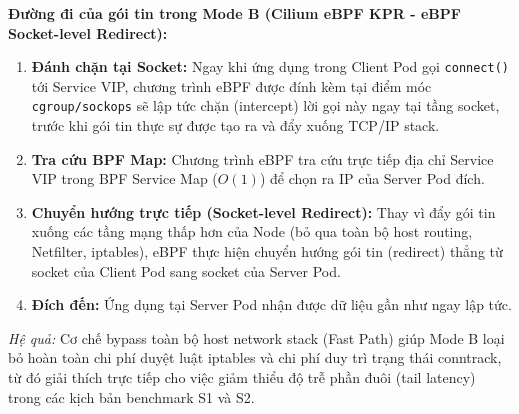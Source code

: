 \textbf{Đường đi của gói tin trong Mode B (Cilium eBPF KPR - eBPF Socket-level Redirect):}
\begin{enumerate}
    \item \textbf{Đánh chặn tại Socket:} Ngay khi ứng dụng trong Client Pod gọi \texttt{connect()} tới Service VIP, chương trình eBPF được đính kèm tại điểm móc \texttt{cgroup/sockops} sẽ lập tức chặn (intercept) lời gọi này ngay tại tầng socket, trước khi gói tin thực sự được tạo ra và đẩy xuống TCP/IP stack.
    \item \textbf{Tra cứu BPF Map:} Chương trình eBPF tra cứu trực tiếp địa chỉ Service VIP trong BPF Service Map ($O(1)$) để chọn ra IP của Server Pod đích.
    \item \textbf{Chuyển hướng trực tiếp (Socket-level Redirect):} Thay vì đẩy gói tin xuống các tầng mạng thấp hơn của Node (bỏ qua toàn bộ host routing, Netfilter, iptables), eBPF thực hiện chuyển hướng gói tin (redirect) thẳng từ socket của Client Pod sang socket của Server Pod.
    \item \textbf{Đích đến:} Ứng dụng tại Server Pod nhận được dữ liệu gần như ngay lập tức.
\end{enumerate}
\textit{Hệ quả:} Cơ chế bypass toàn bộ host network stack (Fast Path) giúp Mode B loại bỏ hoàn toàn chi phí duyệt luật iptables và chi phí duy trì trạng thái conntrack, từ đó giải thích trực tiếp cho việc giảm thiểu độ trễ phần đuôi (tail latency) trong các kịch bản benchmark S1 và S2.

